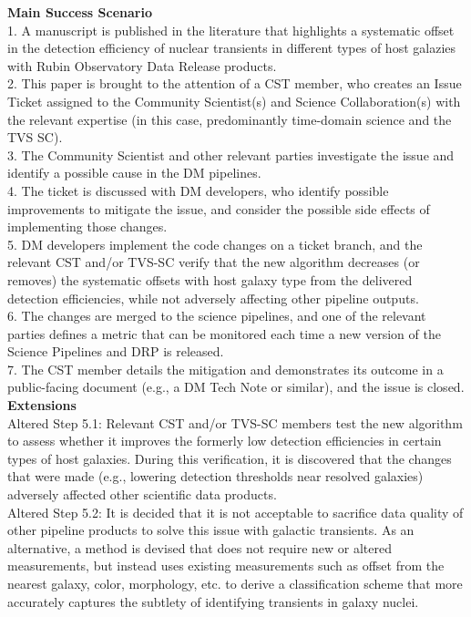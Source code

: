 {\bf Main Success Scenario} \\
1. A manuscript is published in the literature that highlights a systematic offset in the detection efficiency of nuclear transients in different types of host galazies with Rubin Observatory Data Release products. \\
2. This paper is brought to the attention of a CST member, who creates an Issue Ticket assigned to the Community Scientist(s) and Science Collaboration(s) with the relevant expertise (in this case, predominantly time-domain science and the TVS SC). \\
3. The Community Scientist and other relevant parties investigate the issue and identify a possible cause in the DM pipelines. \\
4. The ticket is discussed with DM developers, who identify possible improvements to mitigate the issue, and consider the possible side effects of implementing those changes. \\
5. DM developers implement the code changes on a ticket branch, and the relevant CST and/or TVS-SC verify that the new algorithm decreases (or removes) the systematic offsets with host galaxy type from the delivered detection efficiencies, while not adversely affecting other pipeline outputs. \\
6. The changes are merged to the science pipelines, and one of the relevant parties defines a metric that can be monitored each time a new version of the Science Pipelines and DRP is released. \\
7.  The CST member details the mitigation and demonstrates its outcome in a public-facing document (e.g., a DM Tech Note or similar), and the issue is closed. \\

{\bf Extensions} \\
Altered Step 5.1: Relevant CST and/or TVS-SC members test the new algorithm to assess whether it improves the formerly low detection efficiencies in certain types of host galaxies.  During this verification, it is discovered that the changes that were made (e.g., lowering detection thresholds near resolved galaxies) adversely affected other scientific data products. \\
Altered Step 5.2: It is decided that it is not acceptable to sacrifice data quality of other pipeline products to solve this issue with galactic transients.  As an alternative, a method is devised that does not require new or altered measurements, but instead uses existing measurements such as offset from the nearest galaxy, color, morphology, etc. to derive a classification scheme that more accurately captures the subtlety of identifying transients in galaxy nuclei. \\

